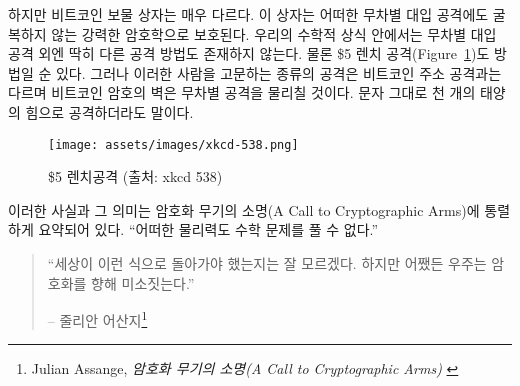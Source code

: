 \begin{comment}
	Bitcoin's treasure chest is very different. It is secured by strong
	cryptography, which does not give way to brute force. And as long as the
	underlying mathematical assumptions hold, brute force is all we have.
	Granted, there is also the option of a global \$5 wrench attack (Figure~\ref{fig:xkcd-538})
	But torture won't work for all bitcoin addresses, and the cryptographic
	walls of bitcoin will defeat brute force attacks. Even if you come at it
	with the force of a thousand suns. Literally.
\end{comment}
하지만 비트코인 보물 상자는 매우 다르다. 
이 상자는 어떠한 무차별 대입 공격에도 굴복하지 않는 강력한 암호학으로 보호된다. 
우리의 수학적 상식 안에서는 무차별 대입 공격 외엔 딱히 다른 공격 방법도 존재하지 않는다. 
물론 \$5 렌치 공격(Figure~\ref{fig:xkcd-538})도 방법일 순 있다. 
그러나 이러한 사람을 고문하는 종류의 공격은 비트코인 주소 공격과는 다르며 비트코인 암호의 벽은 무차별 공격을 물리칠 것이다. 
문자 그대로 천 개의 태양의 힘으로 공격하더라도 말이다. 

\begin{figure}
	\centering
	\texttt{[image: assets/images/xkcd-538.png]}
	\caption{\$5 렌치공격 (출처: xkcd 538)}
	\label{fig:xkcd-538}
\end{figure}

\begin{comment}
	This fact and its implications were poignantly summarized in the call
	to cryptographic arms: \textit{\enquote{No amount of coercive force will ever solve
	a math problem.}
\end{comment}
이러한 사실과 그 의미는 암호화 무기의 소명(A Call to Cryptographic Arms)에 통렬하게 요약되어 있다.
\enquote{어떠한 물리력도 수학 문제를 풀 수 없다.}

\begin{comment}
	\begin{quotation}\begin{samepage}
			\enquote{It isn't obvious that the world had to work this way. But somehow the
				universe smiles on encryption.}
			\begin{flushright} -- Julian Assange\footnote{Julian Assange, \textit{A Call to Cryptographic Arms} \cite{call-to-cryptographic-arms}}
	\end{flushright}\end{samepage}\end{quotation}
\end{comment}
\begin{quotation}\begin{samepage}
		\enquote{세상이 이런 식으로 돌아가야 했는지는 잘 모르겠다. 하지만 어쨌든 우주는 암호화를 향해 미소짓는다.}
		\begin{flushright} -- 줄리안 어산지\footnote{Julian Assange, \textit{암호화 무기의 소명(A Call to Cryptographic Arms)} \cite{call-to-cryptographic-arms}}
\end{flushright}\end{samepage}\end{quotation}

